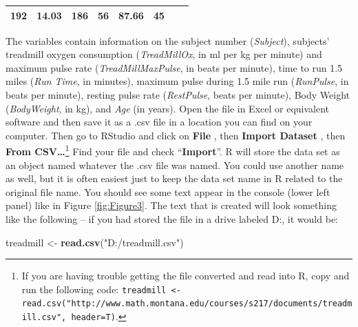 \documentclass[]{book}
\newenvironment{Shaded}{\begin{snugshade}}{\end{snugshade}}
\newcommand{\KeywordTok}[1]{\textcolor[rgb]{0.13,0.29,0.53}{\textbf{{#1}}}}
\newcommand{\StringTok}[1]{\textcolor[rgb]{0.31,0.60,0.02}{{#1}}}
\newcommand{\NormalTok}[1]{{#1}}
\let\rmarkdownfootnote\footnote%
\def\footnote{\protect\rmarkdownfootnote}
\begin{document}
\begin{longtable}[]{@{}lllrrlrr@{}}
\begin{minipage}[t]{0.14\columnwidth}
192\strut
\end{minipage} & \begin{minipage}[t]{0.09\columnwidth}\raggedleft\strut
14.03\strut
\end{minipage} & \begin{minipage}[t]{0.10\columnwidth}\raggedleft\strut
186\strut
\end{minipage} & \begin{minipage}[t]{0.08\columnwidth}\raggedright\strut
56\strut
\end{minipage} & \begin{minipage}[t]{0.15\columnwidth}\raggedleft\strut
87.66\strut
\end{minipage} & \begin{minipage}[t]{0.04\columnwidth}\raggedleft\strut
45\strut
\end{minipage}\tabularnewline
\bottomrule
\end{longtable}

The variables contain information on the subject number
(\emph{Subject}), subjects' treadmill oxygen consumption
(\emph{TreadMillOx}, in ml per kg per minute) and maximum pulse rate
(\emph{TreadMillMaxPulse}, in beats per minute), time to run 1.5 miles
(\emph{Run Time}, in minutes), maximum pulse during 1.5 mile run
(\emph{RunPulse}, in beats per minute), resting pulse rate
(\emph{RestPulse}, beats per minute), Body Weight (\emph{BodyWeight}, in
kg), and \emph{Age} (in years). Open the file in Excel or equivalent
software and then save it as a .csv file in a location you can find on
your computer. Then go to RStudio and click on \textbf{File} , then
\textbf{Import Dataset} , then \textbf{From CSV\ldots{}}\footnote{If you
  are having trouble getting the file converted and read into R, copy
  and run the following code:
  \texttt{treadmill\ \textless{}-read.csv("http://www.math.montana.edu/courses/s217/documents/treadmill.csv",\ header=T)}.}
Find your file and check ``\textbf{Import}''. R will store the data set
as an object named whatever the .csv file was named. You could use
another name as well, but it is often easiest just to keep the data set
name in R related to the original file name. You should see some text
appear in the console (lower left panel) like in Figure
\ref{fig:Figure3}. The text that is created will look something like the
following -- if you had stored the file in a drive labeled D:, it would
be:

\begin{Shaded}
\begin{Highlighting}[]
\NormalTok{treadmill <-}\StringTok{ }\KeywordTok{read.csv}\NormalTok{(}\StringTok{"D:/treadmill.csv"}\NormalTok{)}
\end{Highlighting}
\end{Shaded}
\end{document}

